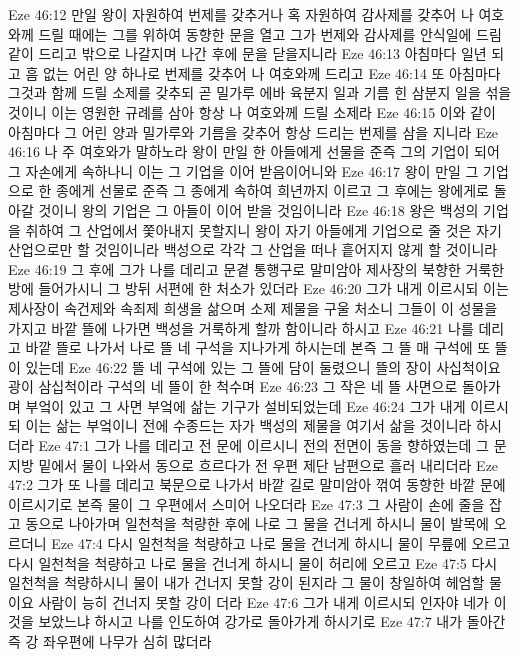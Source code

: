 Eze 46:12  만일 왕이 자원하여 번제를 갖추거나 혹 자원하여 감사제를 갖추어 나 여호와께 드릴 때에는 그를 위하여 동향한 문을 열고 그가 번제와 감사제를 안식일에 드림같이 드리고 밖으로 나갈지며 나간 후에 문을 닫을지니라
Eze 46:13  아침마다 일년 되고 흠 없는 어린 양 하나로 번제를 갖추어 나 여호와께 드리고
Eze 46:14  또 아침마다 그것과 함께 드릴 소제를 갖추되 곧 밀가루 에바 육분지 일과 기름 힌 삼분지 일을 섞을 것이니 이는 영원한 규례를 삼아 항상 나 여호와께 드릴 소제라
Eze 46:15  이와 같이 아침마다 그 어린 양과 밀가루와 기름을 갖추어 항상 드리는 번제를 삼을 지니라
Eze 46:16  나 주 여호와가 말하노라 왕이 만일 한 아들에게 선물을 준즉 그의 기업이 되어 그 자손에게 속하나니 이는 그 기업을 이어 받음이어니와
Eze 46:17  왕이 만일 그 기업으로 한 종에게 선물로 준즉 그 종에게 속하여 희년까지 이르고 그 후에는 왕에게로 돌아갈 것이니 왕의 기업은 그 아들이 이어 받을 것임이니라
Eze 46:18  왕은 백성의 기업을 취하여 그 산업에서 쫓아내지 못할지니 왕이 자기 아들에게 기업으로 줄 것은 자기 산업으로만 할 것임이니라 백성으로 각각 그 산업을 떠나 흩어지지 않게 할 것이니라
Eze 46:19  그 후에 그가 나를 데리고 문곁 통행구로 말미암아 제사장의 북향한 거룩한 방에 들어가시니 그 방뒤 서편에 한 처소가 있더라
Eze 46:20  그가 내게 이르시되 이는 제사장이 속건제와 속죄제 희생을 삶으며 소제 제물을 구울 처소니 그들이 이 성물을 가지고 바깥 뜰에 나가면 백성을 거룩하게 할까 함이니라 하시고
Eze 46:21  나를 데리고 바깥 뜰로 나가서 나로 뜰 네 구석을 지나가게 하시는데 본즉 그 뜰 매 구석에 또 뜰이 있는데
Eze 46:22  뜰 네 구석에 있는 그 뜰에 담이 둘렸으니 뜰의 장이 사십척이요 광이 삼십척이라 구석의 네 뜰이 한 척수며
Eze 46:23  그 작은 네 뜰 사면으로 돌아가며 부엌이 있고 그 사면 부엌에 삶는 기구가 설비되었는데
Eze 46:24  그가 내게 이르시되 이는 삶는 부엌이니 전에 수종드는 자가 백성의 제물을 여기서 삶을 것이니라 하시더라
Eze 47:1  그가 나를 데리고 전 문에 이르시니 전의 전면이 동을 향하였는데 그 문지방 밑에서 물이 나와서 동으로 흐르다가 전 우편 제단 남편으로 흘러 내리더라
Eze 47:2  그가 또 나를 데리고 북문으로 나가서 바깥 길로 말미암아 꺾여 동향한 바깥 문에 이르시기로 본즉 물이 그 우편에서 스미어 나오더라
Eze 47:3  그 사람이 손에 줄을 잡고 동으로 나아가며 일천척을 척량한 후에 나로 그 물을 건너게 하시니 물이 발목에 오르더니
Eze 47:4  다시 일천척을 척량하고 나로 물을 건너게 하시니 물이 무릎에 오르고 다시 일천척을 척량하고 나로 물을 건너게 하시니 물이 허리에 오르고
Eze 47:5  다시 일천척을 척량하시니 물이 내가 건너지 못할 강이 된지라 그 물이 창일하여 헤엄할 물이요 사람이 능히 건너지 못할 강이 더라
Eze 47:6  그가 내게 이르시되 인자야 네가 이것을 보았느냐 하시고 나를 인도하여 강가로 돌아가게 하시기로
Eze 47:7  내가 돌아간즉 강 좌우편에 나무가 심히 많더라
